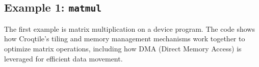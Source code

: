 \subsection*{Example 1: \texttt{matmul}}

The first example is matrix multiplication on a device program. The code shows how Croqtile's tiling and memory management mechanisms work together to optimize matrix operations, including how DMA (Direct Memory Access) is leveraged for efficient data movement.
